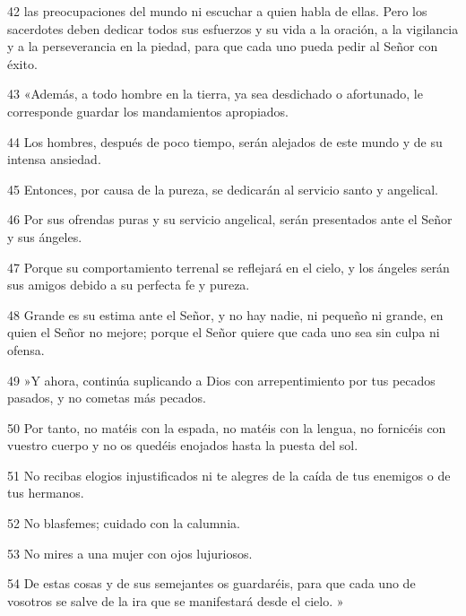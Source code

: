 \par 42 las preocupaciones del mundo ni escuchar a quien habla de ellas. Pero los sacerdotes deben dedicar todos sus esfuerzos y su vida a la oración, a la vigilancia y a la perseverancia en la piedad, para que cada uno pueda pedir al Señor con éxito.

\par 43 «Además, a todo hombre en la tierra, ya sea desdichado o afortunado, le corresponde guardar los mandamientos apropiados.

\par 44 Los hombres, después de poco tiempo, serán alejados de este mundo y de su intensa ansiedad.

\par 45 Entonces, por causa de la pureza, se dedicarán al servicio santo y angelical.

\par 46 Por sus ofrendas puras y su servicio angelical, serán presentados ante el Señor y sus ángeles.

\par 47 Porque su comportamiento terrenal se reflejará en el cielo, y los ángeles serán sus amigos debido a su perfecta fe y pureza.

\par 48 Grande es su estima ante el Señor, y no hay nadie, ni pequeño ni grande, en quien el Señor no mejore; porque el Señor quiere que cada uno sea sin culpa ni ofensa.

\par 49 »Y ahora, continúa suplicando a Dios con arrepentimiento por tus pecados pasados, y no cometas más pecados.

\par 50 Por tanto, no matéis con la espada, no matéis con la lengua, no fornicéis con vuestro cuerpo y no os quedéis enojados hasta la puesta del sol.

\par 51 No recibas elogios injustificados ni te alegres de la caída de tus enemigos o de tus hermanos.

\par 52 No blasfemes; cuidado con la calumnia.

\par 53 No mires a una mujer con ojos lujuriosos.

\par 54 De estas cosas y de sus semejantes os guardaréis, para que cada uno de vosotros se salve de la ira que se manifestará desde el cielo. »

